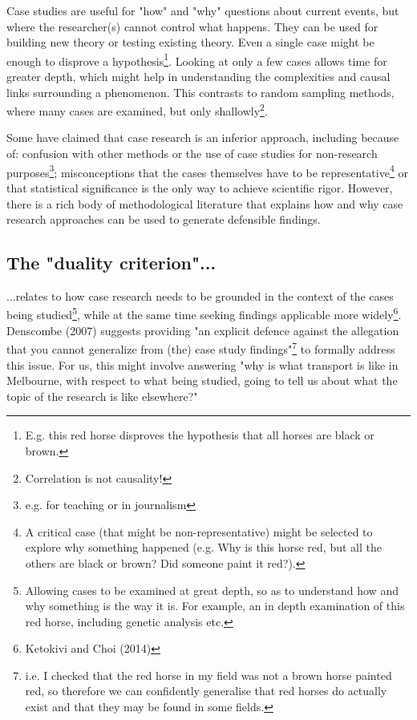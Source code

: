 \documentclass{tufte-handout}
\begin{document}
Case studies are useful for "how" and "why" questions 
about current events, 
but where the researcher(s) cannot 
control what happens. 
They can be used for building new theory 
or testing existing theory. 
Even a single case might be enough to disprove 
a hypothesis\footnote{
E.g. this red horse disproves the hypothesis that all horses are black or brown.}.
Looking at only a few cases 
allows time for greater depth, 
which might help in understanding
the complexities and causal links surrounding a phenomenon.  
This contrasts to random sampling methods, where many cases are examined, but only shallowly\cite{Denscombe2007aa}\footnote{Correlation is not causality!}.

Some have claimed that case research is an inferior approach, including because of: confusion with other methods or the use of case studies for non-research purposes\footnote{e.g. for teaching or in journalism}; misconceptions that the cases themselves have to be representative\footnote{A critical case (that might be non-representative) might be selected to explore why something happened (e.g. Why is this horse red, but all the others are black or brown? Did someone paint it red?).} or that statistical significance is the only way to achieve scientific rigor. However, there is a rich body of methodological literature that explains how and why case research approaches can be used to generate defensible findings\cite{Bonoma1984aa,}. 


\subsection{The "duality criterion"...}
...relates to how case research needs to be grounded in the context of the cases being studied\footnote{Allowing cases to be examined at great depth, so as to understand how and why something is the way it is. For example, an in depth examination of this red horse, including genetic analysis etc.}, while at the same time seeking findings applicable more widely\footnote{Ketokivi and Choi (2014)}. Denscombe (2007) suggests providing "an explicit defence against the allegation that you cannot generalize from (the) case study findings"\footnote{i.e. I checked that the red horse in my field was not a brown horse painted red, so therefore we can confidently generalise that red horses do actually exist and that they may be found in some fields.} to formally address this issue. For us, this might involve answering "why is what transport is like in Melbourne, with respect to what being studied, going to tell us about what the topic of the research is like elsewhere?"
\end{document}

